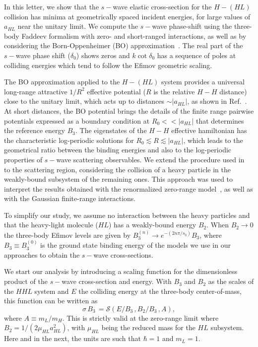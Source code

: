 \documentclass[twocolumn,amsmath,amssymb,epsfig,aps,prl]{revtex4}
\begin{document}
 In this letter, we show that the $s-$wave elastic cross-section for the $H-(HL)$ collision 
has minima at geometrically spaced incident energies, for large  values of $a_{HL}$ near the unitary limit. 
We compute the $s-$wave 
phase-shift using the three-body Faddeev formalism with zero- and short-ranged interactions, as 
well as by considering the Born-Oppenheimer (BO) approximation~\cite{1979fonseca}.  
The real part of the $s-$wave phase shift ($\delta_0$) shows zeros and $k\cot\delta_0$ has a sequence of 
poles at colliding energies which tend to follow the Efimov geometric scaling. 

The BO approximation applied to the $H-(HL)$ system provides 
a universal long-range attractive $1/R^{2}$ effective potential ($R$ is the relative $H-H$ distance) 
close to the unitary limit, which acts up to distances $\sim |a_{HL}|$, as shown in Ref.~\cite{1979fonseca}.
At short distances,  the BO potential brings the details of the finite range pairwise potentials expressed as
a boundary condition at $R_0<<|a_{HL}|$ that determines the reference energy $B_3$. The eigenstates of the $H-H$ effective 
hamiltonian has the characteristic log-periodic solutions for $R_0\lesssim  R \lesssim |a_{HL}|$, which leads
to the geometrical ratio between the binding energies and also to the log-periodic properties of $s-$wave scattering 
observables. We extend the procedure used in ~\cite{1979fonseca} to the
scattering region, considering the collision of a heavy particle in the weakly-bound subsystem of the 
remaining ones.  This approach was used to interpret the results
obtained with the renormalized zero-range model~\cite{2012frederico}, as well as with the Gaussian finite-range interactions.

To simplify our study, we assume no interaction between the heavy particles 
and that the heavy-light molecule ($HL$)  has a weakly-bound energy $B_2$. 
When $B_2\to 0$ the three-body Efimov levels are given by 
$B_{3}^{(n)} \to e^{-(2n\pi/s_0)} B_3$, where $ B_3\equiv B_3^{(0)}$ is the 
ground state binding energy of the models we use  in our approaches to obtain the  
$s-$wave cross-sections.

We start our analysis by introducing a scaling function for the dimensionless product of the $s-$wave cross-section 
and energy.  With $B_3$ and $B_2$ as the scales of the  $HHL$ system and $E$ the 
colliding energy at the three-body center-of-mass, this function can be written as
\begin{equation}
\sigma \,B_3\,={\mathcal S}\left(E/B_3\,, {B_2/B_3}\,, A 
\right),
\label{scalingf}
\end{equation}
where $A\equiv m_L/m_H$.
This is strictly valid at the zero-range limit where $B_2=1/(2 \mu_{HL} a_{HL}^2)$,
with $\mu_{HL}$ being the reduced mass for the $HL$ subsystem. Here and in the
next, the units are such that $\hbar=1$ and $m_L=1$. 
\end{document}
